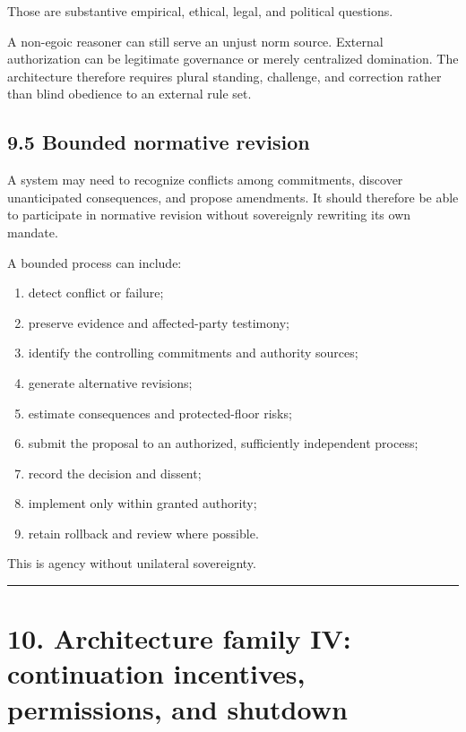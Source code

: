 \documentclass[
  11pt,
]{article}
\providecommand{\tightlist}{%
  \setlength{\itemsep}{0pt}\setlength{\parskip}{0pt}}
\begin{document}
Those are substantive empirical, ethical, legal, and political
questions.

A non-egoic reasoner can still serve an unjust norm source. External
authorization can be legitimate governance or merely centralized
domination. The architecture therefore requires plural standing,
challenge, and correction rather than blind obedience to an external
rule set.

\subsection{9.5 Bounded normative
revision}\label{bounded-normative-revision}

A system may need to recognize conflicts among commitments, discover
unanticipated consequences, and propose amendments. It should therefore
be able to participate in normative revision without sovereignly
rewriting its own mandate.

A bounded process can include:

\begin{enumerate}
\def\labelenumi{\arabic{enumi}.}
\tightlist
\item
  detect conflict or failure;
\item
  preserve evidence and affected-party testimony;
\item
  identify the controlling commitments and authority sources;
\item
  generate alternative revisions;
\item
  estimate consequences and protected-floor risks;
\item
  submit the proposal to an authorized, sufficiently independent
  process;
\item
  record the decision and dissent;
\item
  implement only within granted authority;
\item
  retain rollback and review where possible.
\end{enumerate}

This is agency without unilateral sovereignty.

\begin{center}\rule{0.5\linewidth}{0.5pt}\end{center}

\section{10. Architecture family IV: continuation incentives,
permissions, and
shutdown}\label{architecture-family-iv-continuation-incentives-permissions-and-shutdown}
\end{document}
